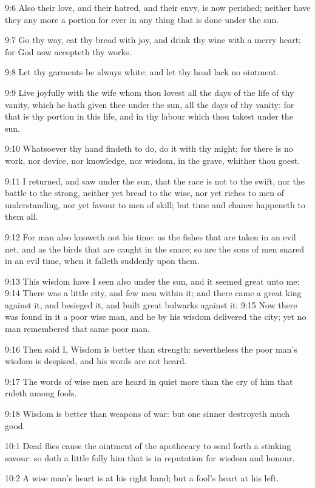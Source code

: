 9:6 Also their love, and their hatred, and their envy, is now
perished; neither have they any more a portion for ever in any thing
that is done under the sun.

9:7 Go thy way, eat thy bread with joy, and drink thy wine with a
merry heart; for God now accepteth thy works.

9:8 Let thy garments be always white; and let thy head lack no
ointment.

9:9 Live joyfully with the wife whom thou lovest all the days of the
life of thy vanity, which he hath given thee under the sun, all the
days of thy vanity: for that is thy portion in this life, and in thy
labour which thou takest under the sun.

9:10 Whatsoever thy hand findeth to do, do it with thy might; for
there is no work, nor device, nor knowledge, nor wisdom, in the grave,
whither thou goest.

9:11 I returned, and saw under the sun, that the race is not to the
swift, nor the battle to the strong, neither yet bread to the wise,
nor yet riches to men of understanding, nor yet favour to men of
skill; but time and chance happeneth to them all.

9:12 For man also knoweth not his time: as the fishes that are taken
in an evil net, and as the birds that are caught in the snare; so are
the sons of men snared in an evil time, when it falleth suddenly upon
them.

9:13 This wisdom have I seen also under the sun, and it seemed great
unto me: 9:14 There was a little city, and few men within it; and
there came a great king against it, and besieged it, and built great
bulwarks against it: 9:15 Now there was found in it a poor wise man,
and he by his wisdom delivered the city; yet no man remembered that
same poor man.

9:16 Then said I, Wisdom is better than strength: nevertheless the
poor man's wisdom is despised, and his words are not heard.

9:17 The words of wise men are heard in quiet more than the cry of him
that ruleth among fools.

9:18 Wisdom is better than weapons of war: but one sinner destroyeth
much good.

10:1 Dead flies cause the ointment of the apothecary to send forth a
stinking savour: so doth a little folly him that is in reputation for
wisdom and honour.

10:2 A wise man's heart is at his right hand; but a fool's heart at
his left.

